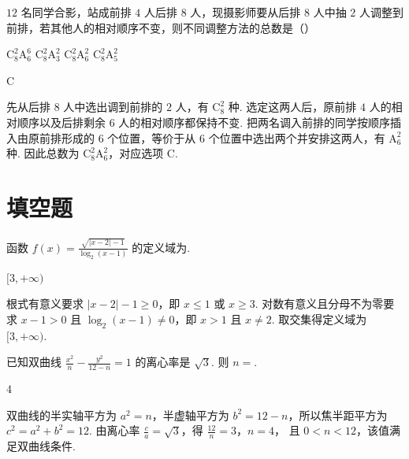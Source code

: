 \begin{problem}
\(12\) 名同学合影，站成前排 \(4\) 人后排 \(8\) 人，现摄影师要从后排 \(8\) 人中抽 \(2\) 人调整到前排，若其他人的相对顺序不变，则不同调整方法的总数是（\quad）

\choices
    {\(\mathrm{C}_8^2\mathrm{A}_6^6\)}
    {\(\mathrm{C}_8^2\mathrm{A}_3^2\)}
    {\(\mathrm{C}_8^2\mathrm{A}_6^2\)}
    {\(\mathrm{C}_8^2\mathrm{A}_5^2\)}
\end{problem}

\begin{answer}
C
\end{answer}

\begin{solution}
先从后排 \(8\) 人中选出调到前排的 \(2\) 人，有 \(\mathrm C_8^2\) 种. 选定这两人后，原前排 \(4\) 人的相对顺序以及后排剩余 \(6\) 人的相对顺序都保持不变. 把两名调入前排的同学按顺序插入由原前排形成的 \(6\) 个位置，等价于从 \(6\) 个位置中选出两个并安排这两人，有 \(\mathrm A_6^2\) 种. 因此总数为 \(\mathrm C_8^2\mathrm A_6^2\)，对应选项 C.
\end{solution}

\section{填空题}

\begin{problem}
函数 \( f(x) = \frac{\sqrt{|x - 2| - 1}}{\log_2(x - 1)} \) 的定义域为\fillinblank{}.
\end{problem}

\begin{answer}
\([3,+\infty)\)
\end{answer}

\begin{solution}
根式有意义要求 \(|x-2|-1\geqslant0\)，即 \(x\leqslant1\) 或 \(x\geqslant3\). 对数有意义且分母不为零要求 \(x-1>0\) 且 \(\log_2(x-1)\ne0\)，即 \(x>1\) 且 \(x\ne2\). 取交集得定义域为 \([3,+\infty)\).
\end{solution}

\begin{problem}
已知双曲线 \(\frac{x^2}{n} - \frac{y^2}{12 - n} = 1\) 的离心率是 \(\sqrt{3}\). 则 \(n = \)\fillinblank{}.
\end{problem}

\begin{answer}
\(4\)
\end{answer}

\begin{solution}
双曲线的半实轴平方为 \(a^2=n\)，半虚轴平方为 \(b^2=12-n\)，所以焦半距平方为 \(c^2=a^2+b^2=12\). 由离心率 \(\frac{c}{a}=\sqrt3\)，得
\(\frac{12}{n}=3\)，\(n=4\)，
且 \(0<n<12\)，该值满足双曲线条件.
\end{solution}

